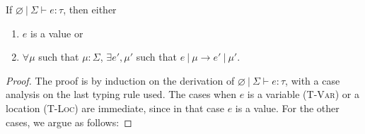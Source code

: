 \documentclass{llncs}
\begin{document}
\begin{theorem}[Progress]
If $\varnothing~|~\Sigma \vdash e : \tau$, then either
\begin{enumerate}
\item $e$ is a value or
\item $\forall \mu$ such that $\mu : \Sigma$,
   $\exists e', \mu'$ such that $e~|~\mu \rightarrow e'~|~\mu'$.
\end{enumerate}
\end{theorem}
\begin{proof} The proof is by induction on the derivation of $\varnothing~|~\Sigma \vdash e : \tau$, with a case analysis on the last typing rule used. The cases when $e$ is a variable (\textsc{T-Var}) or a location (\textsc{T-Loc}) are immediate, since in that case $e$ is a value. For the other cases, we argue as follows:


\end{proof}
\end{document}
